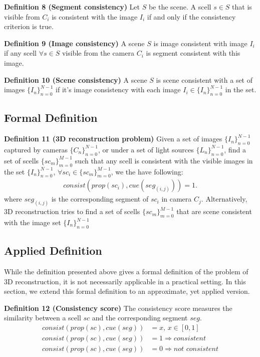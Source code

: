 \noindent\textbf{Definition 8 (Segment consistency)} Let $S$ be the scene. A scell $s\in S$ that is visible from $C_i$ is consistent with the image $I_i$ if and only if the consistency criterion is true.

\noindent\textbf{Definition 9 (Image consistency)} A scene $S$ is image consistent with image $I_i$ if any scell $\forall s\in S$ visible from the camera $C_i$ is segment consistent with this image.

\noindent\textbf{Definition 10 (Scene consistency)} A scene $S$ is scene consistent with a set of images $\{I_n\}_{n=0}^{N-1}$ if it's image consistency with each image $I_i\in \{I_n\}_{n=0}^{N-1}$ in the set.

\subsection{Formal Definition}
\noindent\textbf{Definition 11 (3D reconstruction problem)} Given a set of images $\{I_n\}_{n=0}^{N-1}$ captured by cameras $\{C_n\}_{n=0}^{N-1}$, or under a set of light sources $\{L_n\}_{n=0}^{N-1}$, find a set of scells $\{sc_m\}_{m=0}^{M-1}$ such that any scell is consistent with the visible images in the set $\{I_n\}_{n=0}^{N-1}$, \ie $\forall sc_i\in \{sc_m\}_{m=0}^{M-1}$, we the have following:
\begin{align*}
consist(prop(sc_i), cue(seg_{(i, j)})) = 1.
\end{align*}
where $seg_{(i, j)}$ is the corresponding segment of $sc_i$ in camera $C_j$. Alternatively, 3D reconstruction tries to find a set of scells $\{sc_m\}_{m=0}^{M-1}$ that are scene consistent with the image set $\{I_n\}_{n=0}^{N-1}$

\subsection{Applied Definition}
While the definition presented above gives a formal definition of the problem of 3D reconstruction, it is not necessarily applicable in a practical setting. In this section, we extend this formal definition to an approximate, yet applied version.

\noindent\textbf{Definition 12 (Consistency score)} The consistency score measures the similarity between a scell $sc$ and the corresponding segment $seg$.
\begin{align*}
consist(prop(sc), cue(seg)) &= x \text{, } x\in[0, 1]\\
consist(prop(sc), cue(seg)) &= 1 \Rightarrow \textit{consistent}\\
consist(prop(sc), cue(seg)) &= 0 \Rightarrow \textit{not consistent}
\end{align*}


